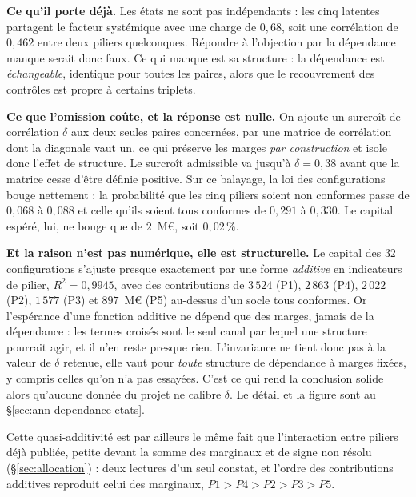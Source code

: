 \textbf{Ce qu'il porte déjà.} Les états ne sont pas indépendants : les cinq latentes partagent le
facteur systémique avec une charge de $0{,}68$, soit une corrélation de $0{,}462$ entre deux
piliers quelconques. Répondre à l'objection par \og{}la dépendance manque\fg{} serait donc faux.
Ce qui manque est sa structure : la dépendance est \emph{échangeable}, identique pour
toutes les paires, alors que le recouvrement des contrôles est propre à certains triplets.

\textbf{Ce que l'omission coûte, et la réponse est nulle.} On ajoute un surcroît de corrélation
$\delta$ aux deux seules paires concernées, par une matrice de corrélation dont la diagonale
vaut un, ce qui préserve les marges \emph{par construction} et isole donc l'effet de structure.
Le surcroît admissible va jusqu'à $\delta = 0{,}38$ avant que la matrice cesse d'être définie
positive. Sur ce balayage, la loi des configurations bouge nettement : la probabilité que les
cinq piliers soient non conformes passe de $0{,}068$ à $0{,}088$ et celle qu'ils soient tous
conformes de $0{,}291$ à $0{,}330$. Le capital espéré, lui, ne bouge que de $2$~M\euro, soit
$0{,}02\,\%$.

\textbf{Et la raison n'est pas numérique, elle est structurelle.} Le capital des $32$
configurations s'ajuste presque exactement par une forme \emph{additive} en indicateurs de
pilier, $R^2 = 0{,}9945$, avec des contributions de $3\,524$ (P1), $2\,863$ (P4), $2\,022$ (P2),
$1\,577$ (P3) et $897$~M\euro{} (P5) au-dessus d'un socle tous conformes. Or l'espérance d'une
fonction additive ne dépend que des marges, jamais de la dépendance : les termes croisés
sont le seul canal par lequel une structure pourrait agir, et il n'en reste presque rien.
L'invariance ne tient donc pas à la valeur de $\delta$ retenue, elle vaut pour \emph{toute}
structure de dépendance à marges fixées, y compris celles qu'on n'a pas essayées. C'est ce qui
rend la conclusion solide alors qu'aucune donnée du projet ne calibre $\delta$. Le détail et la
figure sont au \S\ref{sec:ann-dependance-etats}.

Cette quasi-additivité est par ailleurs le même fait que l'interaction entre piliers déjà
publiée, petite devant la somme des marginaux et de signe non résolu (\S\ref{sec:allocation}) :
deux lectures d'un seul constat, et l'ordre des contributions additives reproduit celui des
marginaux, $P1 > P4 > P2 > P3 > P5$.

